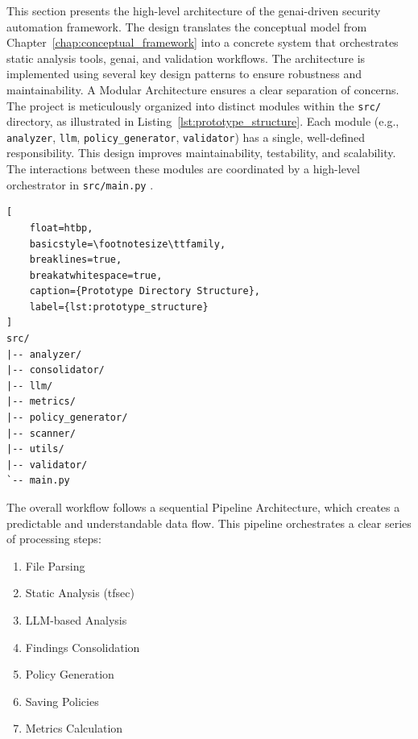 This section presents the high-level architecture of the \gls{genai}-driven security automation framework. The design translates the conceptual model from Chapter~\ref{chap:conceptual_framework} into a concrete system that orchestrates static analysis tools, \gls{genai}, and validation workflows. The architecture is implemented using several key design patterns to ensure robustness and maintainability.
A Modular Architecture ensures a clear separation of concerns. The project is meticulously organized into distinct modules within the \texttt{src/} directory, as illustrated in Listing~\ref{lst:prototype_structure}. Each module (e.g., \texttt{analyzer}, \texttt{llm}, \texttt{policy\_generator}, \texttt{validator}) has a single, well-defined responsibility. This design improves maintainability, testability, and scalability. The interactions between these modules are coordinated by a high-level orchestrator in \texttt{src/main.py} \cite{martin_clean_2009}.
\begin{lstlisting}[
    float=htbp,
    basicstyle=\footnotesize\ttfamily, 
    breaklines=true,
    breakatwhitespace=true,
    caption={Prototype Directory Structure},
    label={lst:prototype_structure}
]
src/
|-- analyzer/
|-- consolidator/
|-- llm/
|-- metrics/
|-- policy_generator/
|-- scanner/
|-- utils/
|-- validator/
`-- main.py
\end{lstlisting}

The overall workflow follows a sequential Pipeline Architecture, which creates a predictable and understandable data flow. This pipeline orchestrates a clear series of processing steps:
\begin{enumerate}
\item File Parsing
\item Static Analysis (tfsec)
\item LLM-based Analysis
\item Findings Consolidation
\item Policy Generation
\item Saving Policies
\item Metrics Calculation
\end{enumerate}

